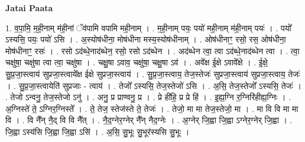 \documentclass[17pt]{extarticle}
\begin{document}
\textbf{Jatai Paata} \newline

1. व॒पा॒मि॒ म॒ही॒नाम् म॑ही॒नां ॅव॑पामि वपामि मही॒नाम् । . म॒ही॒नाम् पयः॒ पयो॑ मही॒नाम् म॑ही॒नाम् पयः॑ । . पयो᳚ ऽस्यसि॒ पयः॒ पयो॑ ऽसि । . अ॒स्योष॑धीना॒ मोष॑धीना मस्य॒स्योष॑धीनाम् । . ओष॑धीनाꣳ॒॒ रसो॒ रस॒ ओष॑धीना॒ मोष॑धीनाꣳ॒॒ रसः॑ । . रसो ऽद॑ब्धे॒नाद॑ब्धेन॒ रसो॒ रसो ऽद॑ब्धेन । . अद॑ब्धेन त्वा॒ त्वा ऽद॑ब्धे॒नाद॑ब्धेन त्वा । . त्वा॒ चक्षु॑षा॒ चक्षु॑षा त्वा त्वा॒ चक्षु॑षा । . चक्षु॒षा ऽवाव॒ चक्षु॑षा॒ चक्षु॒षा ऽव॑ । . अवे᳚क्ष ई॒क्षे ऽवावे᳚क्षे । . ई॒क्षे॒ सु॒प्र॒जा॒स्त्वाय॑ सुप्रजा॒स्त्वाये᳚क्ष ईक्षे सुप्रजा॒स्त्वाय॑ । . सु॒प्र॒जा॒स्त्वाय॒ तेज॒स्तेजः॑ सुप्रजा॒स्त्वाय॑ सुप्रजा॒स्त्वाय॒ तेजः॑ । . सु॒प्र॒जा॒स्त्वायेति॑ सुप्रजाः - त्वाय॑ । . तेजो᳚ ऽस्यसि॒ तेज॒स्तेजो॑ ऽसि । . अ॒सि॒ तेज॒स्तेजो᳚ ऽस्यसि॒ तेजः॑ । . तेजो ऽन्वनु॒ तेज॒स्तेजो ऽनु॑ । . अनु॒ प्र प्राण्वनु॒ प्र । . प्रे ही॑हि॒ प्र प्रे हि॑ । . इ॒ह्य॒ग्नि र॒ग्निरि॑हीह्य॒ग्निः । . अ॒ग्निस्ते॑ ते॒ ऽग्निर॒ग्निस्ते᳚ । . ते॒ तेज॒ स्तेज॑स्ते ते॒ तेजः॑ । . तेजो॒ मा मा तेज॒स्तेजो॒ मा । . मा वि वि मा मा वि । . वि नै᳚न् नै॒द् वि वि नै᳚त् । . नै॒द॒ग्नेर॒ग्नेर् नै᳚न् नैद॒ग्नेः । . अ॒ग्नेर् जि॒ह्वा जि॒ह्वा ऽग्नेर॒ग्नेर् जि॒ह्वा । . जि॒ह्वा ऽस्य॑सि जि॒ह्वा जि॒ह्वा ऽसि॑ । . अ॒सि॒ सु॒भूः सु॒भूर॑स्यसि सु॒भूः । \newline
\end{document}
